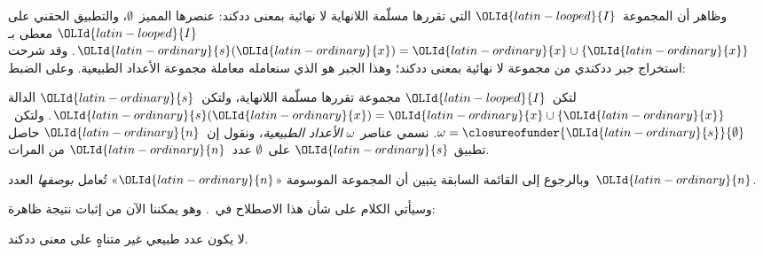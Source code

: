 \documentclass[../../../include/open-logic-section]{subfiles}
\begin{document}
وظاهر أن المجموعة~$\OLId{latin-looped}{I}$ التي تقررها مسلّمة اللانهاية لا نهائية بمعنى
ددكند: عنصرها المميز~$\emptyset$، والتطبيق الحقني على
$\OLId{latin-looped}{I}$ معطى بـ$\OLId{latin-ordinary}{s}(\OLId{latin-ordinary}{x}) = \OLId{latin-ordinary}{x}\cup\{\OLId{latin-ordinary}{x}\}$. وقد شرحت
 استخراج
جبر ددكندي من مجموعة لا نهائية بمعنى ددكند؛ وهذا الجبر هو الذي سنعامله
معاملة مجموعة الأعداد الطبيعية. وعلى الضبط:
\begin{defn}
لتكن~$\OLId{latin-looped}{I}$ مجموعة تقررها مسلّمة اللانهاية، ولتكن~$\OLId{latin-ordinary}{s}$ الدالة
$\OLId{latin-ordinary}{s}(\OLId{latin-ordinary}{x}) = \OLId{latin-ordinary}{x} \cup \{\OLId{latin-ordinary}{x}\}$. ولتكن~$\omega = \closureofunder{\OLId{latin-ordinary}{s}}{\emptyset}$.
نسمي عناصر~$\omega$ \emph{الأعداد الطبيعية}، ونقول إن~$\OLId{latin-ordinary}{n}$ حاصل تطبيق
$\OLId{latin-ordinary}{s}$ على~$\emptyset$ عدد~$\OLId{latin-ordinary}{n}$ من المرات.
\end{defn}

وبالرجوع إلى القائمة السابقة يتبين أن المجموعة الموسومة «$\OLId{latin-ordinary}{n}$» تُعامل
\emph{بوصفها} العدد~$\OLId{latin-ordinary}{n}$.

وسيأتي الكلام على شأن هذا الاصطلاح في~. وهو
يمكننا الآن من إثبات نتيجة ظاهرة:

\begin{prop}
لا يكون عدد طبيعي غير متناهٍ على معنى ددكند.
\end{prop}
\end{document}
